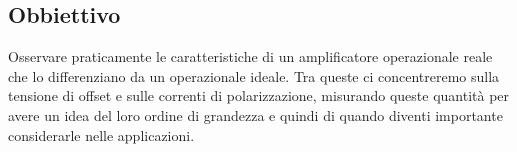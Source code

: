 \subsection{Obbiettivo}

Osservare praticamente le caratteristiche di un amplificatore operazionale reale che
lo differenziano da un operazionale ideale. Tra queste ci concentreremo sulla tensione
di offset e sulle correnti di polarizzazione, misurando queste quantità per avere
un idea del loro ordine di grandezza e quindi di quando diventi importante considerarle
nelle applicazioni.
